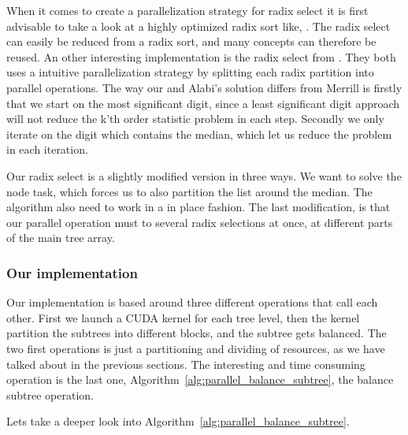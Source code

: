 When it comes to create a parallelization strategy for radix select it is first advisable to take a look at a highly optimized radix sort like, \citep{MerrillG11}. The radix select can easily be reduced from a radix sort, and many concepts can therefore be reused. An other interesting implementation is the radix select from \citep{Alabi:2012}. They both uses a intuitive parallelization strategy by splitting each radix partition into parallel operations. The way our and Alabi's solution differs from Merrill is firstly that we start on the most significant digit, since a least significant digit approach will not reduce the k'th order statistic problem in each step. Secondly we only iterate on the digit which contains the median, which let us reduce the problem in each iteration.

Our radix select is a slightly modified version in three ways. We want to solve the node task, which forces us to also partition the list around the median. The algorithm also need to work in a in place fashion. The last modification, is that our parallel operation must to several radix selections at once, at different parts of the main tree array.


\subsubsection{Our implementation} %
\label{ssub:our_implementation}


Our implementation is based around three different operations that call each other. First we launch a CUDA kernel for each tree level, then the kernel partition the subtrees into different blocks, and the subtree gets balanced. The two first operations is just a partitioning and dividing of resources, as we have talked about in the previous sections. The interesting and time consuming operation is the last one, Algorithm~\ref{alg:parallel_balance_subtree}, the balance subtree operation.


Lets take a deeper look into Algorithm~\ref{alg:parallel_balance_subtree}.

